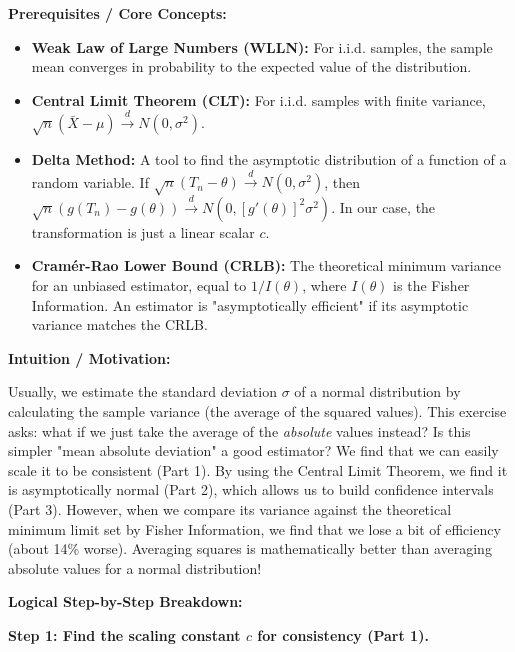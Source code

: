 \begin{solution}
\textbf{Prerequisites / Core Concepts:}
\begin{itemize}
    \item \textbf{Weak Law of Large Numbers (WLLN):} For i.i.d. samples, the sample mean converges in probability to the expected value of the distribution.
    \item \textbf{Central Limit Theorem (CLT):} For i.i.d. samples with finite variance, $\sqrt{n}(\bar{X} - \mu) \xrightarrow{d} N(0, \sigma^2)$.
    \item \textbf{Delta Method:} A tool to find the asymptotic distribution of a function of a random variable. If $\sqrt{n}(T_n - \theta) \xrightarrow{d} N(0, \sigma^2)$, then $\sqrt{n}(g(T_n) - g(\theta)) \xrightarrow{d} N(0, [g'(\theta)]^2 \sigma^2)$. In our case, the transformation is just a linear scalar $c$.
    \item \textbf{Cramér-Rao Lower Bound (CRLB):} The theoretical minimum variance for an unbiased estimator, equal to $1/I(\theta)$, where $I(\theta)$ is the Fisher Information. An estimator is "asymptotically efficient" if its asymptotic variance matches the CRLB.
\end{itemize}

\textbf{Intuition / Motivation:}

Usually, we estimate the standard deviation $\sigma$ of a normal distribution by calculating the sample variance (the average of the squared values). This exercise asks: what if we just take the average of the \textit{absolute} values instead? Is this simpler "mean absolute deviation" a good estimator? We find that we can easily scale it to be consistent (Part 1). By using the Central Limit Theorem, we find it is asymptotically normal (Part 2), which allows us to build confidence intervals (Part 3). However, when we compare its variance against the theoretical minimum limit set by Fisher Information, we find that we lose a bit of efficiency (about 14\% worse). Averaging squares is mathematically better than averaging absolute values for a normal distribution!

\textbf{Logical Step-by-Step Breakdown:}

\textbf{Step 1: Find the scaling constant $c$ for consistency (Part 1).}


\end{solution}
